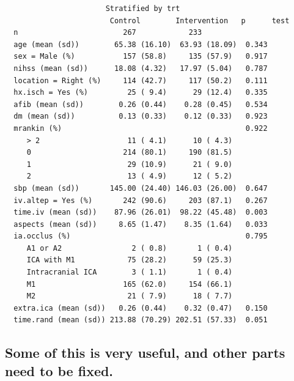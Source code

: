 \documentclass[]{book}
\theoremstyle{definition}
\theoremstyle{definition}
\theoremstyle{definition}
\theoremstyle{remark}
\begin{document}
\begin{verbatim}
                       Stratified by trt
                        Control        Intervention   p      test
  n                        267            233                    
  age (mean (sd))        65.38 (16.10)  63.93 (18.09)  0.343     
  sex = Male (%)           157 (58.8)     135 (57.9)   0.917     
  nihss (mean (sd))      18.08 (4.32)   17.97 (5.04)   0.787     
  location = Right (%)     114 (42.7)     117 (50.2)   0.111     
  hx.isch = Yes (%)         25 ( 9.4)      29 (12.4)   0.335     
  afib (mean (sd))        0.26 (0.44)    0.28 (0.45)   0.534     
  dm (mean (sd))          0.13 (0.33)    0.12 (0.33)   0.923     
  mrankin (%)                                          0.922     
     > 2                    11 ( 4.1)      10 ( 4.3)             
     0                     214 (80.1)     190 (81.5)             
     1                      29 (10.9)      21 ( 9.0)             
     2                      13 ( 4.9)      12 ( 5.2)             
  sbp (mean (sd))       145.00 (24.40) 146.03 (26.00)  0.647     
  iv.altep = Yes (%)       242 (90.6)     203 (87.1)   0.267     
  time.iv (mean (sd))    87.96 (26.01)  98.22 (45.48)  0.003     
  aspects (mean (sd))     8.65 (1.47)    8.35 (1.64)   0.033     
  ia.occlus (%)                                        0.795     
     A1 or A2                2 ( 0.8)       1 ( 0.4)             
     ICA with M1            75 (28.2)      59 (25.3)             
     Intracranial ICA        3 ( 1.1)       1 ( 0.4)             
     M1                    165 (62.0)     154 (66.1)             
     M2                     21 ( 7.9)      18 ( 7.7)             
  extra.ica (mean (sd))   0.26 (0.44)    0.32 (0.47)   0.150     
  time.rand (mean (sd)) 213.88 (70.29) 202.51 (57.33)  0.051     
\end{verbatim}

\subsection{Some of this is very useful, and other parts need to be
fixed.}\label{some-of-this-is-very-useful-and-other-parts-need-to-be-fixed.}
\end{document}
